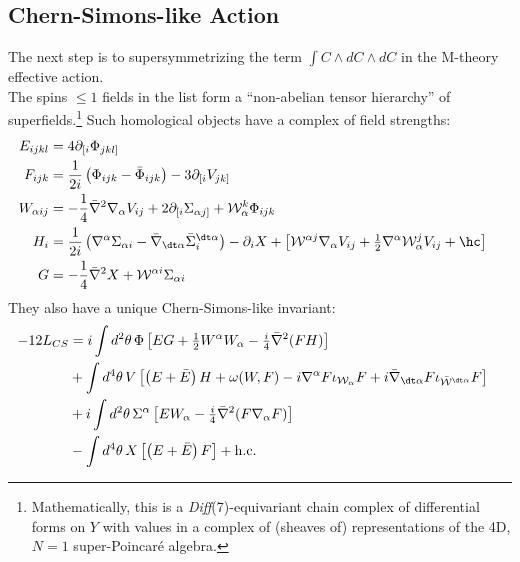 \documentclass[a4paper,12pt]{article} %
\begin{document}
\subsection{Chern-Simons-like Action}
The next step is to supersymmetrizing the term $\int C \wedge dC \wedge dC$ in the M-theory effective action. \\
The spins $\leq 1$ fields in the list form a ``non-abelian tensor hierarchy'' of superfields.\footnote{Mathematically, this is a {\it Diff}(7)-equivariant chain complex of differential forms on $Y$ with values in a complex of (sheaves of) representations of the 4D, $N=1$ super-Poincar\'e algebra.} 
Such homological objects have a complex of field strengths:
\begin{align}
E_{ijkl} &= 4\partial_{[i} \Phi_{jkl]}
	\cr
F_{ijk} &= \frac1{2i}\left( \Phi_{ijk} - \bar \Phi_{ijk}\right) - 3\partial_{[i} V_{jk]}
	\cr
W_{\alpha ij} &= -\frac14 \bar \nabla^2 \nabla_\alpha V_{ij}
	+2\partial_{[i} \Sigma_{\alpha j]}
	+ \mathcal W_\alpha^k \Phi_{ijk}
	\cr
H_i &= \frac1{2i}\left(\nabla^\alpha \Sigma_{\alpha i} - \bar \nabla_{\dt \alpha} \bar \Sigma_i^{\dt \alpha} \right)
	-\partial_i X 
	+\left[  \mathcal W^{\alpha j} \nabla_\alpha  V_{ij}
		+\tfrac12 \nabla^\alpha \mathcal W_\alpha^j   V_{ij}
	+\hc \right]
	\cr
G&= -\frac14 \bar \nabla^2 X 
	+ \mathcal W^{\alpha i} \Sigma_{\alpha	i}
\nonumber
\end{align}
They also have a unique Chern-Simons-like invariant:
\begin{align}
-12 L_{CS} &= 
i \int d^2 \theta  \,   \Phi \left[
	E G + \tfrac12 W^\alpha W_\alpha - \tfrac i4 \bar {\nabla}^2 (  F H) 
	\right]
\cr&+ \int d^4 \theta  \,  V \left[  
	\left( E + \bar E\right) H + \omega(W, F) 
	- i {\nabla}^\alpha F\iota_{\mathcal W_\alpha}F 
	+ i \bar {\nabla}_{\dt \alpha} F \iota_{\bar{\mathcal W}^{\dt \alpha} }F 
	\right]
\cr&+i \int d^2 \theta  \, \Sigma^\alpha \left[
	E W_\alpha -\tfrac i4 \bar {\nabla}^2 (  F {\nabla}_\alpha F) 
	\right]
\cr&- \int d^4 \theta  \, X \left[  
	\left( E + \bar E\right) F
	\right]
	+\mathrm{h.c.} 	
\nonumber
\end{align}
\end{document}
